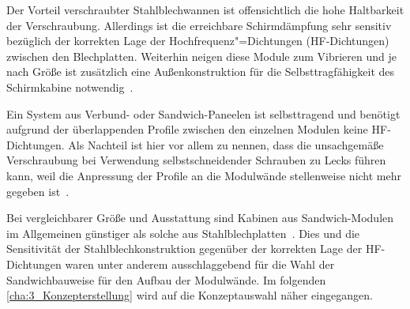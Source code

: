 Der Vorteil verschraubter Stahlblechwannen ist offensichtlich die hohe Haltbarkeit der Verschraubung. Allerdings ist die erreichbare Schirmdämpfung sehr sensitiv bezüglich der korrekten Lage der Hochfrequenz"=Dichtungen (HF-Dichtungen) zwischen den Blechplatten. Weiterhin neigen diese Module zum Vibrieren und je nach Größe ist zusätzlich eine Außenkonstruktion für die Selbsttragfähigkeit des Schirmkabine notwendig~\cite{EM_Schirmung}.
\par
\vspace{\linespace}
Ein System aus Verbund- oder Sandwich-Paneelen ist selbsttragend und benötigt aufgrund der überlappenden Profile zwischen den einzelnen Modulen keine HF-Dichtungen. Als Nachteil ist hier vor allem zu nennen, dass die unsachgemäße Verschraubung bei Verwendung selbstschneidender Schrauben zu Lecks führen kann, weil die Anpressung der Profile an die Modulwände stellenweise nicht mehr gegeben ist~\cite{EM_Schirmung}. 
\par
\vspace{\linespace}
Bei vergleichbarer Größe und Ausstattung sind Kabinen aus Sandwich-Modulen im Allgemeinen günstiger als solche aus Stahlblechplatten~\cite{EMC-Technik_Sandwichmodul, EMC-Technik_Stahlblechplatten}. Dies und die Sensitivität der Stahlblechkonstruktion gegenüber der korrekten Lage der HF-Dichtungen waren unter anderem ausschlaggebend für die Wahl der Sandwichbauweise für den Aufbau der Modulwände. Im folgenden \Abschnitt\ref{cha:3_Konzepterstellung} wird auf die Konzeptauswahl näher eingegangen.  %






